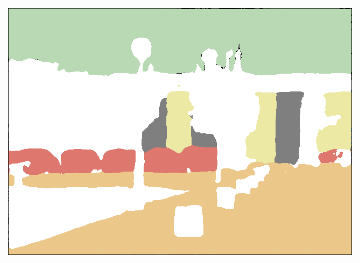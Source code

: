 \begin{figure}[!htb]
\begin{minipage}{0.48\textwidth}
\begin{subfigure}[b]{0.3\linewidth}
		\end{subfigure}
		\begin{subfigure}[b]{0.3\linewidth}
		\end{subfigure}\\
		\begin{subfigure}[b]{0.3\linewidth}
			\includegraphics[width=\linewidth]{Figures/VISAPP/49pred.png}
		\end{subfigure}
		\begin{subfigure}[b]{0.3\linewidth}

\end{subfigure}
\end{minipage}
\end{figure}
